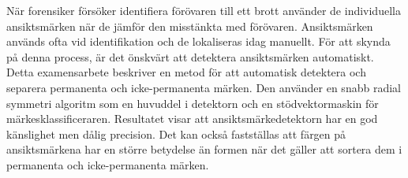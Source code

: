 När forensiker försöker identifiera förövaren till ett brott använder de individuella ansiktsmärken när de jämför den misstänkta med förövaren. Ansiktsmärken används ofta vid identifikation och de lokaliseras idag manuellt. För att skynda på denna process, är det önskvärt att detektera ansiktsmärken automatiskt. Detta examensarbete beskriver en metod för att automatisk detektera och separera permanenta och icke-permanenta märken. Den använder en snabb radial symmetri algoritm som en huvuddel i detektorn och en stödvektormaskin för märkesklassificeraren. Resultatet visar att ansiktsmärkedetektorn har en god känslighet men dålig precision. Det kan också fastställas att färgen på ansiktsmärkena har en större betydelse än formen när det gäller att sortera dem i permanenta och icke-permanenta märken. 